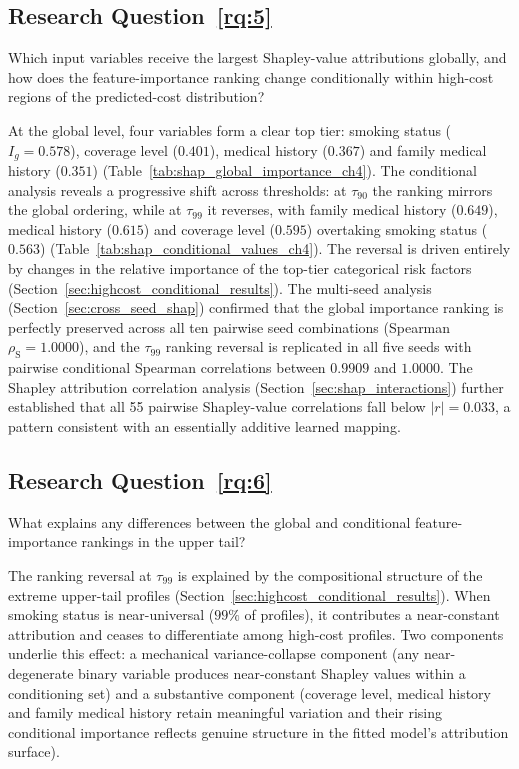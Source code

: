 \subsection{Research Question~\ref{rq:5}}
Which input variables receive the largest Shapley-value
attributions globally, and how does the feature-importance ranking change
conditionally within high-cost regions of the predicted-cost distribution?

At the global level, four variables form a clear top tier: smoking status
($I_g = 0.578$), coverage level ($0.401$), medical history ($0.367$) and
family medical history ($0.351$)
(Table~\ref{tab:shap_global_importance_ch4}).  The conditional analysis
reveals a progressive shift across thresholds: at $\tau_{90}$ the
ranking mirrors the global ordering, while at $\tau_{99}$ it reverses,
with family medical history ($0.649$), medical history ($0.615$) and
coverage level ($0.595$) overtaking smoking status ($0.563$)
(Table~\ref{tab:shap_conditional_values_ch4}).  The reversal is driven
entirely by changes in the relative importance of the top-tier
categorical risk factors
(Section~\ref{sec:highcost_conditional_results}).  The multi-seed
analysis (Section~\ref{sec:cross_seed_shap}) confirmed that the global
importance ranking is perfectly preserved across all ten pairwise seed
combinations (Spearman $\rho_{\mathrm{S}} = 1.0000$), and the
$\tau_{99}$ ranking reversal is replicated in all five seeds with
pairwise conditional Spearman correlations between $0.9909$ and
$1.0000$.  The Shapley attribution correlation analysis
(Section~\ref{sec:shap_interactions}) further established that all 55
pairwise Shapley-value correlations fall below $|r| = 0.033$, a pattern
consistent with an essentially additive learned mapping.

\subsection{Research Question~\ref{rq:6}}
What explains any differences between the global and conditional
feature-importance rankings in the upper tail?

The ranking reversal at $\tau_{99}$ is explained by the compositional
structure of the extreme upper-tail profiles
(Section~\ref{sec:highcost_conditional_results}).  When smoking status is
near-universal ($99\%$ of profiles), it contributes a near-constant
attribution and ceases to differentiate among high-cost profiles.
Two components underlie this effect: a mechanical variance-collapse
component (any near-degenerate binary variable produces near-constant
Shapley values within a conditioning set) and a substantive component
(coverage level, medical history and family medical history retain
meaningful variation and their rising conditional importance reflects
genuine structure in the fitted model's attribution surface).

